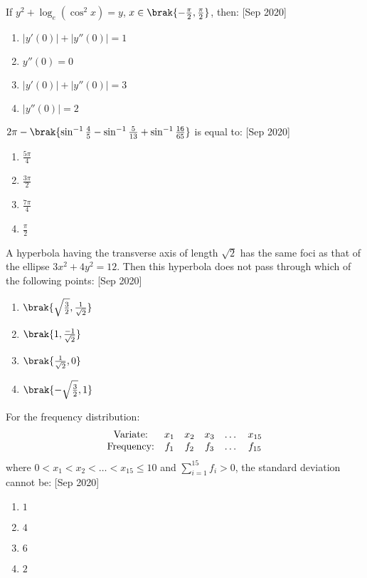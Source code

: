     \item If $ y^2 + \log_e(\cos^2x) = y $, $ x \in \brak{-\frac{\pi}{2}, \frac{\pi}{2}} $, then:
    \hfill{[Sep 2020]}
    \begin{enumerate}
        \item $ |y'(0)| + |y''(0)| = 1 $
        \item $ y''(0) = 0 $
        \item $ |y'(0)| + |y''(0)| = 3 $
        \item $ |y''(0)| = 2 $
    \end{enumerate}

    \item $ 2\pi-\brak{\sin^{-1}\frac{4}{5} - \sin^{-1}\frac{5}{13} + \sin^{-1}\frac{16}{65}}$ 
    is equal to:
    \hfill{[Sep 2020]}
    \begin{enumerate}
        \item $ \frac{5\pi}{4} $
        \item $ \frac{3\pi}{2} $
        \item $ \frac{7\pi}{4} $
        \item $ \frac{\pi}{2} $
    \end{enumerate}

    \item A hyperbola having the transverse axis of length $\sqrt{2}$ has the same foci as that of the ellipse $ 3x^2 + 4y^2 = 12 $. Then this hyperbola does not pass through which of the following points:
    \hfill{[Sep 2020]}
    \begin{enumerate}
        \item $ \brak{ \sqrt{\frac{3}{2}}, \frac{1}{\sqrt{2}} } $
        \item $ \brak{ 1, \frac{-1}{\sqrt{2}} } $
        \item $ \brak{ \frac{1}{\sqrt{2}}, 0 } $
        \item $ \brak{ -\sqrt{\frac{3}{2}}, 1} $
    \end{enumerate}

    \item For the frequency distribution:
\[
\begin{array}{c c c c c c c}
\text{Variate:} & x_1 & x_2 & x_3 & \dots & x_{15} \\
\text{Frequency:} & f_1 & f_2 & f_3 & \dots & f_{15}
\end{array}
\]
    where $ 0 < x_1 < x_2 < \dots < x_{15} \leq 10 $ and $ \sum_{i=1}^{15} f_i > 0 $, the standard deviation cannot be:
    \hfill{[Sep 2020]}
    \begin{enumerate}
        \item $ 1 $
        \item $ 4 $
        \item $ 6 $
        \item $ 2 $
    \end{enumerate}


